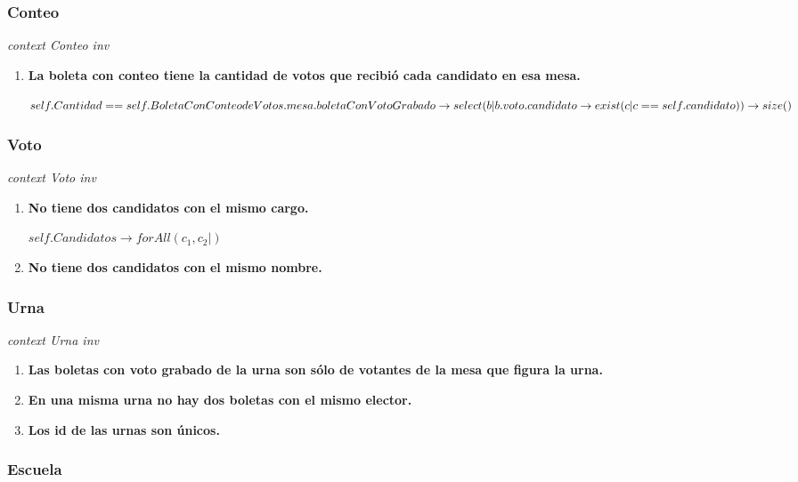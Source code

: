 \subsubsection*{Conteo}

\textit{context Conteo
inv}

\begin{enumerate}

\item \textbf{La boleta con conteo tiene la cantidad de votos que recibi\'o cada candidato en esa mesa.}

$self.Cantidad == \\
self.BoletaConConteodeVotos.mesa.boletaConVotoGrabado \rightarrow \\
select(b | b.voto.candidato  \rightarrow exist(c | c==self.candidato)) \rightarrow size() $

\end{enumerate}

\subsubsection*{Voto}

\textit{context Voto
inv}

\begin{enumerate}
\item \textbf{No tiene dos candidatos con el mismo cargo.}

$self.Candidatos  \rightarrow forAll(c_1, c_2 | )$

\item \textbf{No tiene dos candidatos con el mismo nombre.}
\end{enumerate}

\subsubsection*{Urna}

\textit{context Urna
inv}

\begin{enumerate}
\item \textbf{Las boletas con voto grabado de la urna son sólo de votantes de la mesa que figura la urna.}
\item \textbf{En una misma urna no hay dos boletas con el mismo elector.}    
\item \textbf{Los id de las urnas son únicos.}
\end{enumerate}

\subsubsection*{Escuela}


